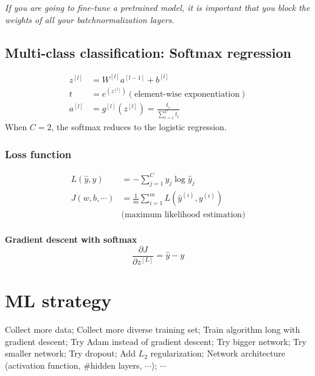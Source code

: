 \emph{\textcolor{Bittersweet}{If you are going to fine-tune a pretrained model, it is important that you block the weights of all your batchnormalization layers.}}

%
\subsection{Multi-class classification: Softmax regression}
\begin{align}
z^{[l]} &= W^{[l]}a^{[l-1]} + b^{[l]} \nonumber \\
t &= e^{(z^{[l]})} (\text{element-wise exponentiation})\\
a^{[l]} &= g^{[l]}(z^{[l]}) = \frac{t_i}{\sum_{i = 1}^C t_i}
\end{align}
When $C = 2$, the softmax reduces to the logistic regression.
\subsubsection{Loss function}
\begin{align}
L(\hat{y},y) &= -\sum_{j= 1}^C y_j \log{\hat{y}_j}\\
J(w, b, \cdots)&= \frac{1}{m}\sum_{i= 1}^m L(\hat{y}^{(i)},y^{(i)})\\
&\text{(maximum likelihood estimation)}
\end{align}
\\
\textbf{Gradient descent with softmax}
$$\frac{\partial J}{\partial z^{[L]}} = \hat{y} - y$$


\section{ML strategy}
Collect more data;
Collect more diverse training set;
Train algorithm long with gradient descent;
Try Adam instead of gradient descent;
Try bigger network;
Try smaller network;
Try dropout;
Add $L_2$ regularization;
Network architecture (activation function, \#hidden layers, $\cdots$);
$\cdots$

%
